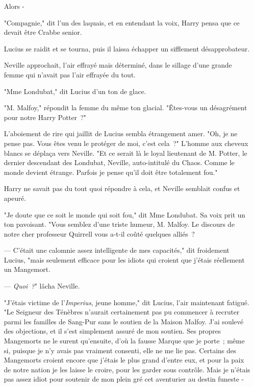 Alors -

"Compagnie," dit l'un des laquais, et en entendant la voix, Harry pensa que ce devait être Crabbe senior.

Lucius se raidit et se tourna, puis il laissa échapper un sifflement désapprobateur.

Neville approchait, l'air effrayé mais déterminé, dans le sillage d'une grande femme qui n'avait pas l'air effrayée du tout.

"Mme Londubat," dit Lucius d'un ton de glace.

"M. Malfoy," répondit la femme du même ton glacial. "Êtes-vous un désagrément pour notre Harry Potter~?"

L'aboiement de rire qui jaillit de Lucius sembla étrangement amer. "Oh, je ne pense pas. Vous êtes venu le protéger de moi, c'est cela~?" L'homme aux cheveux blancs se déplaça vers Neville. "Et ce serait là le loyal lieutenant de M. Potter, le dernier descendant des Londubat, Neville, auto-intitulé du Chaos. Comme le monde devient étrange. Parfois je pense qu'il doit être totalement fou."

Harry ne savait pas du tout quoi répondre à cela, et Neville semblait confus et apeuré.

"Je doute que ce soit le monde qui soit fou," dit Mme Londubat. Sa voix prit un ton pavoisant. "Vous semblez d'une triste humeur, M. Malfoy. Le discours de notre cher professeur Quirrell vous a-t-il coûté quelques alliés~?

--- C'était une calomnie assez intelligente de mes capacités," dit froidement Lucius, "mais seulement efficace pour les idiots qui croient que j'étais réellement un Mangemort.

--- \emph{Quoi~?}" lâcha Neville.

"J'étais victime de l'\emph{Imperius}, jeune homme," dit Lucius, l'air maintenant fatigué. "Le Seigneur des Ténèbres n'aurait certainement pas pu commencer à recruter parmi les familles de Sang-Pur sans le soutien de la Maison Malfoy. J'ai soulevé des objections, et il s'est simplement assuré de mon soutien. Ses propres Mangemorts ne le surent qu'ensuite, d'où la fausse Marque que je porte~; même si, puisque je n'y avais pas vraiment consenti, elle ne me lie pas. Certains des Mangemorts croient encore que j'étais le plus grand d'entre eux, et pour la paix de notre nation je les laisse le croire, pour les garder sous contrôle. Mais je n'étais pas assez idiot pour soutenir de mon plein gré cet aventurier au destin funeste -

